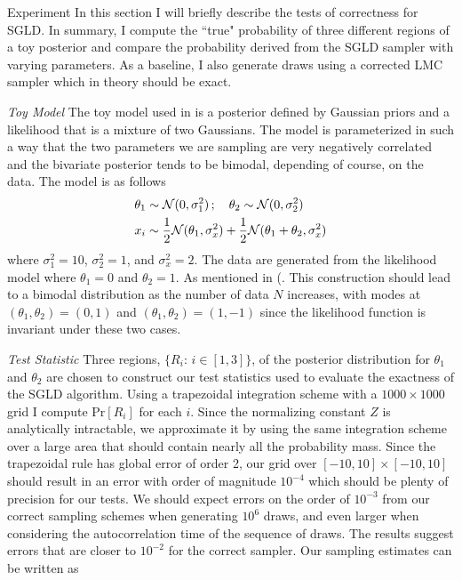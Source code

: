 \documentclass{article}
\newcommand{\Prob}[2]{\underset{#2}{\mbox{Pr}}\!\left[#1\right]}
\begin{document}
\begin{section}{Experiment}
In this section I will briefly describe the tests of correctness for SGLD.  In summary, I compute the ``true" probability of three different regions of a toy posterior and compare the probability derived from the SGLD sampler with varying parameters.  As a baseline, I also generate draws using a corrected LMC sampler which in theory should be exact.
\begin{subsection}{\it Toy Model}
The toy model used in \cite{WelTeh2011a} is a posterior defined by Gaussian priors and a likelihood that is a mixture of two Gaussians.  The model is parameterized in such a way that the two parameters we are sampling are very negatively correlated and the bivariate posterior tends to be bimodal, depending of course, on the data.  The model is as follows
\begin{align}
& \theta_1 \sim \mathcal{N}(0,\sigma_1^2)\,; \quad \theta_2 \sim \mathcal{N}(0,\sigma_2^2) \notag \\
& x_i \sim \frac{1}{2}\mathcal{N}(\theta_1,\sigma_x^2) + \frac{1}{2}\mathcal{N}(\theta_1+\theta_2,\sigma_x^2) \notag
\end{align}
where $\sigma_1^2=10$, $\sigma_2^2=1$, and $\sigma_x^2=2$.  The data are generated from the likelihood model where $\theta_1=0$ and $\theta_2=1$.  As mentioned in (\cite{WelTeh2011a}.  This construction should lead to a bimodal distribution as the number of data $N$ increases, with modes at $(\theta_1,\theta_2) = (0,1)$ and $(\theta_1,\theta_2) = (1,-1)$ since the likelihood function is invariant under these two cases.
\end{subsection}
\begin{subsection}{\it Test Statistic}
Three regions, $\{R_i:\,i\in[1,3]\}$, of the posterior distribution for $\theta_1$ and $\theta_2$ are chosen to construct our test statistics used to evaluate the exactness of the SGLD algorithm.  Using a trapezoidal integration scheme with a $1000\times1000$ grid I compute $\Prob{R_i}{}$ for each $i$.  Since the normalizing constant $Z$ is analytically intractable, we approximate it by using the same integration scheme over a large area that should contain nearly all the probability mass.  Since the trapezoidal rule has global error of order 2, our grid over $[-10,10]\times[-10,10]$ should result in an error with order of magnitude $10^{-4}$ which should be plenty of precision for our tests.  We should expect errors on the order of $10^{-3}$ from our correct sampling schemes when generating $10^6$ draws, and even larger when considering the autocorrelation time of the sequence of draws.  The results suggest errors that are closer to $10^{-2}$ for the correct sampler.  Our sampling estimates can be written as

\end{subsection}
\end{section}
\end{document}
